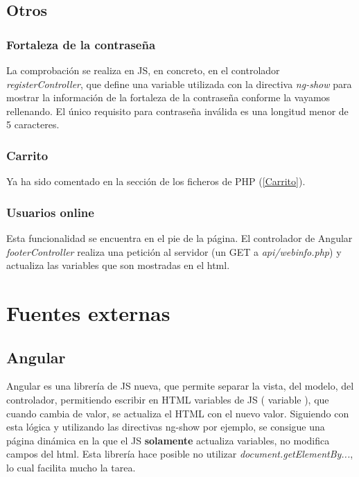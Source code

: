 \documentclass{apuntes}
\begin{document}
\subsection{Otros}

\subsubsection{Fortaleza de la contraseña}
\label{PasStrength}

La comprobación se realiza en JS, en concreto, en el controlador \textit{registerController}, que define una variable utilizada con la directiva \textit{ng-show} para mostrar la información de la fortaleza de la contraseña conforme la vayamos rellenando. El único requisito para contraseña inválida es una longitud menor de 5 caracteres.

\subsubsection{Carrito}

Ya ha sido comentado en la sección de los ficheros de PHP  (\ref{Carrito}).

\subsubsection{Usuarios online}

Esta funcionalidad se encuentra en el pie de la página. El controlador de Angular \textit{footerController} realiza una petición al servidor (un GET a \textit{api/webinfo.php}) y actualiza las variables que son mostradas en el html.

\section{Fuentes externas}

\subsection{Angular}
\label{Angular}

Angular es una librería de JS nueva, que permite separar la vista, del modelo, del controlador, permitiendo escribir en HTML variables de JS ( {{variable }}), que cuando cambia de valor, se actualiza el HTML con el nuevo valor. Siguiendo con esta lógica y utilizando las directivas ng-show por ejemplo, se consigue una página dinámica en la que el JS \textbf{solamente} actualiza variables, no modifica campos del html. Esta librería hace posible no utilizar \textit{document.getElementBy...}, lo cual facilita mucho la tarea.
\end{document}
